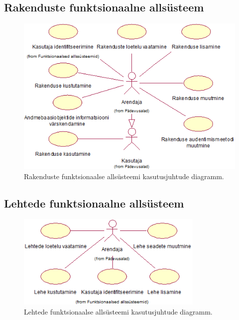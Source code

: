 \documentclass[a4paper,12pt]{article} %
\begin{document}
\subsection*{Rakenduste funktsionaalne allsüsteem}
\begin{figure}[H]
\centering
\includegraphics[width=\textwidth]{./diagrams/applications-subsystem-use-case-digram.png}
\caption{Rakenduste funktsionaalse allsüsteemi kasutusjuhtude diagramm.}
\label{fig_rakenduste_funktsionaalse_allsüsteemi_kasutusjuhtude_eskiismudel}
\end{figure}

\subsection*{Lehtede funktsionaalne allsüsteem}
\begin{figure}[H]
\centering
\includegraphics[width=0.8\textwidth]{./diagrams/pages-subsystem-use-case-digram.png}
\caption{Lehtede funktsionaalse allsüsteemi kasutusjuhtude diagramm.}
\label{fig_lehtede_funktsionaalse_allsüsteemi_kasutusjuhtude_eskiismudel}
\end{figure}
\end{document}
